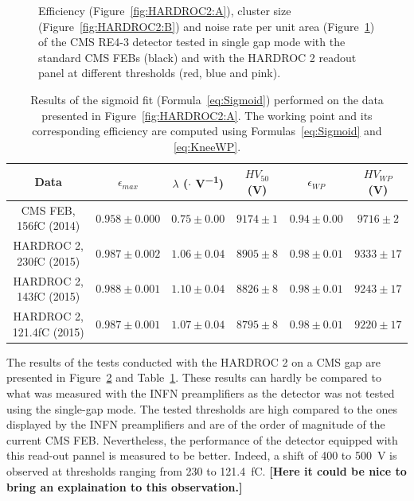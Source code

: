 \begin{figure}[H]
\begin{subfigure}{\linewidth}
			\caption{\label{fig:HARDROC2:C}}
		\end{subfigure}
		\caption{\label{fig:HARDROC2} Efficiency (Figure~\ref{fig:HARDROC2:A}), cluster size (Figure~\ref{fig:HARDROC2:B}) and noise rate per unit area (Figure~\ref{fig:HARDROC2:C}) of the CMS RE4-3 detector tested in single gap mode with the standard CMS FEBs (black) and with the HARDROC 2 readout panel at different thresholds (red, blue and pink).}
	\end{figure}
	
	\begin{table}[H]
		\caption{\label{tab:HARDROC2} Results of the sigmoid fit (Formula~\ref{eq:Sigmoid}) performed on the data presented in Figure~\ref{fig:HARDROC2:A}. The working point and its corresponding efficiency are computed using Formulas~\ref{eq:Sigmoid} and \ref{eq:KneeWP}.}
		\footnotesize
		\begin{tabular}{|c|c|c|c|c|c|}
			\hline
			Data & $\epsilon_{max}$ & $\lambda$ ($\cdot$\Ord{-2} \si{V^{-1}}) & $HV_{50}$ (\si{V}) & $\epsilon_{WP}$ & $HV_{WP}$ (\si{V}) \\ 
			\hline
			CMS FEB, 156fC (2014) & $0.958 \pm 0.000$ & $0.75 \pm 0.00$ & $9174 \pm 1$ & $0.94 \pm 0.00$ & $9716 \pm 2$\\ 
			\hline
			HARDROC 2, 230fC (2015) & $0.987 \pm 0.002$ & $1.06 \pm 0.04$ & $8905 \pm 8$ & $0.98 \pm 0.01$ & $9333 \pm 17$\\ 
			\hline
			HARDROC 2, 143fC (2015) & $0.988 \pm 0.001$ & $1.10 \pm 0.04$ & $8826 \pm 8$ & $0.98 \pm 0.01$ & $9243 \pm 17$\\ 
			\hline
			HARDROC 2, 121.4fC (2015) & $0.987 \pm 0.001$ & $1.07 \pm 0.04$ & $8795 \pm 8$ & $0.98 \pm 0.01$ & $9220 \pm 17$\\ 
			\hline
		\end{tabular}
	\end{table}
	
	The results of the tests conducted with the HARDROC 2 on a CMS gap are presented in Figure~\ref{fig:HARDROC2} and Table~\ref{tab:HARDROC2}. These results can hardly be compared to what was measured with the INFN preamplifiers as the detector was not tested using the single-gap mode. The tested thresholds are high compared to the ones displayed by the INFN preamplifiers and are of the order of magnitude of the current CMS FEB. Nevertheless, the performance of the detector equipped with this read-out pannel is measured to be better. Indeed, a shift of 400 to \SI{500}{V} is observed at thresholds ranging from 230 to \SI{121.4}{fC}. \textbf{[Here it could be nice to bring an explaination to this observation.]}
	
